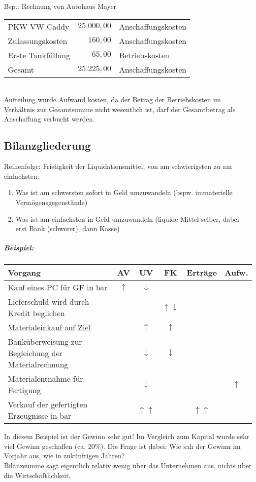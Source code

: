 \begin{itemize}
Bsp.: Rechnung von Autohaus Mayer\\
\begin{tabular}{l r l}
PKW VW Caddy & $25.000,00$ & Anschaffungskosten\\
Zulassungskosten & $160,00$ & Anschaffungskosten\\
Erste Tankfüllung & $65,00$ & Betriebskosten\\
\hline
Gesamt	& $25.225,00$	& Anschaffungskosten\\
\end{tabular}\\
Aufteilung würde Aufwand kosten, da der Betrag der Betriebskosten im Verhältnis zur Gesamtsumme nicht wesentlich ist, darf der Gesamtbetrag als Anschaffung verbucht werden.
\end{itemize}
\subsection{Bilanzgliederung}
Reihenfolge: Fristigkeit der Liquidationsmittel, von am schwierigsten zu am einfachsten: 
\begin{enumerate}
\item Was ist am schwersten sofort in Geld umzuwandeln (bspw. immaterielle Vermögensgegenstände)
\item Was ist am einfachsten in Geld umzuwandeln (liquide Mittel selber, dabei erst Bank (schwerer), dann Kasse)
\end{enumerate}
\subparagraph{Beispiel:} \parskp
\begin{tabular}{L{0.5} c c c c c}
Vorgang & AV & UV & FK & Erträge & Aufw.\\
\hline
Kauf eines PC für GF in bar & $\uparrow$ & $\downarrow$ \\
Lieferschuld wird durch Kredit beglichen & & & $\uparrow \downarrow$ \\
Materialeinkauf auf Ziel & & $\uparrow$ & $\uparrow$\\
Banküberweisung zur Begleichung der Materialrechnung & &$\downarrow$ & $\downarrow$\\
Materialentnahme für Fertigung & & $\downarrow$ & & & $\uparrow$\\
Verkauf der gefertigten Erzeugnisse in bar & &$\uparrow\uparrow$ & & $\uparrow\uparrow$ & \\
\end{tabular}
In diesem Beispiel ist der Gewinn sehr gut! Im Vergleich zum Kapital wurde sehr viel Gewinn geschaffen (ca. 20\%). Die Frage ist dabei: Wie sah der Gewinn im Vorjahr aus, wie in zukünftigen Jahren?\\
Bilanzsumme sagt eigentlich relativ wenig über das Unternehmen aus, nichts über die Wirtschaftlichkeit.

